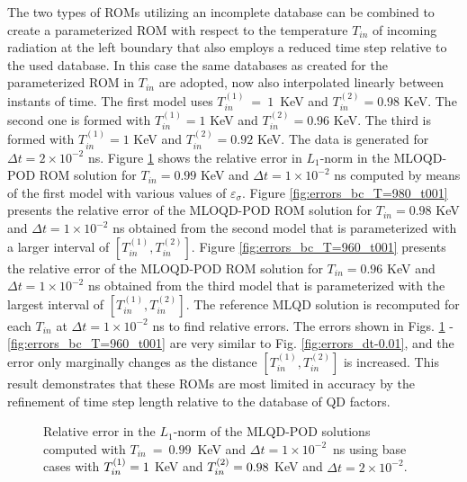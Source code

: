 	\ind The two types of ROMs utilizing an incomplete database can be combined to create a parameterized ROM with respect to the temperature $T_{in}$ of incoming radiation at the left boundary that also employs a reduced time step relative to the used database. In this case the same databases as created for the parameterized ROM in $T_{in}$ are adopted, now also interpolated linearly between instants of time. The first model uses $T_{in}^{(1)}~=~1$~KeV and $T_{in}^{(2)}=0.98$ KeV. The second one is formed with  $T_{in}^{(1)}=1$ KeV and $T_{in}^{(2)}=0.96$ KeV. The third is formed with  $T_{in}^{(1)}=1$ KeV and $T_{in}^{(2)}=0.92$ KeV. The data is generated for $\Delta t = 2\times10^{-2}$ ns. Figure \ref{fig:errors_bc_T=990_t001} shows the relative error in $L_1$-norm in the MLOQD-POD ROM solution  for $T_{in}=0.99$ KeV and $\Delta t = \! 1\! \times\! 10^{-2}$ ns computed by means of the first model with various values of $\varepsilon_{\sigma}$. Figure \ref{fig:errors_bc_T=980_t001} presents the relative error of the MLOQD-POD ROM solution for $T_{in}= 0.98$ KeV and $\Delta t = \! 1\! \times\! 10^{-2}$ ns obtained from the second model that is parameterized with a larger interval of $[T_{in}^{(1)},T_{in}^{(2)}]$. Figure \ref{fig:errors_bc_T=960_t001} presents the relative error of the MLOQD-POD ROM solution  for $T_{in}= 0.96$ KeV and $\Delta t = \! 1\! \times\! 10^{-2}$ ns obtained from the third model that is parameterized with the largest interval of  $[T_{in}^{(1)},T_{in}^{(2)}]$. The reference MLQD solution is recomputed for each $T_{in}$ at $\Delta t = \! 1\! \times\! 10^{-2}$ ns to find relative errors. The errors shown in Figs. \ref{fig:errors_bc_T=990_t001} - \ref{fig:errors_bc_T=960_t001} are very similar to Fig. \ref{fig:errors_dt-0.01}, and the error only marginally changes as the distance $[T_{in}^{(1)},T_{in}^{(2)}]$ is increased. This result demonstrates that these ROMs are most limited in accuracy by the refinement of time step length relative to the database of QD factors.

	\begin{figure}[ht!]
		\centering
		\caption{\label{fig:errors_bc_T=990_t001}
			Relative error in the $L_1$-norm of the MLQD-POD solutions computed with $T_{in}~=~0.99$~KeV and $\Delta t\! =\! 1 \! \times \! 10^{-2}$~ns using base cases with $T_{in}^{\left(1\right)}=1$ KeV  and $T_{in}^{\left(2\right)}=0.98$ KeV and $\Delta t\! =\! 2 \! \times\!  10^{-2}$.}
	\end{figure}

